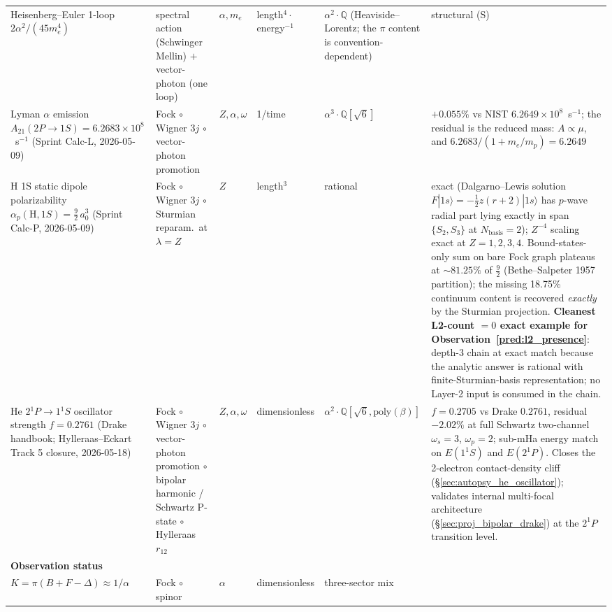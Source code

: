 \documentclass[11pt]{article}
\begin{document}
\begin{longtable}{p{3.5cm} p{2.8cm} p{1.3cm} p{2.2cm} p{1.8cm} p{1.4cm}}
Heisenberg--Euler 1-loop $2\alpha^2/(45 m_e^4)$ &
spectral action (Schwinger Mellin) $+$ vector-photon (one loop)
& $\alpha, m_e$ & length${}^4 \cdot$ energy${}^{-1}$ &
$\alpha^2 \cdot \mathbb{Q}$ (Heaviside--Lorentz; the $\pi$ content is
convention-dependent) & structural (S) \\
Lyman $\alpha$ emission $A_{21}(2P{\to}1S) = 6.2683 \times 10^8$~s$^{-1}$
(Sprint Calc-L, 2026-05-09) & Fock $\circ$ Wigner $3j$ $\circ$
vector-photon promotion & $Z, \alpha, \omega$ & 1/time &
$\alpha^3 \cdot \mathbb{Q}[\sqrt{6}]$ & $+0.055\%$ vs NIST
$6.2649 \times 10^8$~s$^{-1}$; the residual is the reduced mass:
$A \propto \mu$, and $6.2683/(1+m_e/m_p) = 6.2649$ \\
H 1S static dipole polarizability
$\alpha_p(\text{H}, 1S) = \tfrac{9}{2}\, a_0^3$
(Sprint Calc-P, 2026-05-09) & Fock $\circ$ Wigner $3j$ $\circ$
Sturmian reparam.\ at $\lambda = Z$ & $Z$ & length${}^3$ &
rational & exact (Dalgarno--Lewis solution
$F|1s\rangle = -\tfrac{1}{2} z(r{+}2)|1s\rangle$ has $p$-wave radial
part lying exactly in span$\{S_2, S_3\}$ at $N_\text{basis} = 2$);
$Z^{-4}$ scaling exact at $Z = 1, 2, 3, 4$.  Bound-states-only sum
on bare Fock graph plateaus at $\sim 81.25\%$ of $\tfrac{9}{2}$
(Bethe--Salpeter 1957 partition); the missing 18.75\% continuum
content is recovered \emph{exactly} by the Sturmian projection.
\textbf{Cleanest L2-count $= 0$ exact example for
Observation~\ref{pred:l2_presence}}: depth-3 chain at exact match
because the analytic answer is rational with finite-Sturmian-basis
representation; no Layer-2 input is consumed in the chain. \\
He $2{}^1P \to 1{}^1\!S$ oscillator strength $f = 0.2761$
(Drake handbook; Hylleraas--Eckart Track 5 closure, 2026-05-18) &
Fock $\circ$ Wigner $3j$ $\circ$ vector-photon promotion $\circ$
bipolar harmonic / Schwartz P-state $\circ$ Hylleraas $r_{12}$ &
$Z, \alpha, \omega$ & dimensionless &
$\alpha^2 \cdot \mathbb{Q}[\sqrt{6}, \mathrm{poly}(\beta)]$ &
$f = 0.2705$ vs Drake $0.2761$, residual $-2.02\%$ at full Schwartz
two-channel $\omega_s = 3$, $\omega_p = 2$; sub-mHa energy match
on $E(1^1S)$ and $E(2^1P)$.  Closes the 2-electron contact-density
cliff (\S\ref{sec:autopsy_he_oscillator}); validates internal
multi-focal architecture (\S\ref{sec:proj_bipolar_drake}) at the
$2^1P$ transition level. \\
\midrule
\textbf{Observation status} & & & & & \\
$K = \pi(B + F - \Delta) \approx 1/\alpha$ & Fock $\circ$ spinor & $\alpha$ & dimensionless & three-sector mix &

\end{longtable}
\end{document}
